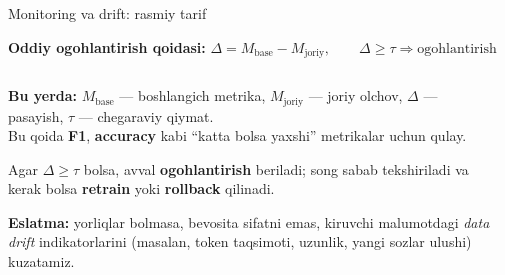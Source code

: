 \documentclass[aspectratio=169,11pt]{beamer}
\newcommand{\uzq}{\textquotesingle{}}   %
\begin{document}
\begin{frame}{Monitoring va drift: rasmiy ta\uzq{}rif}
  \small

  \begin{tcolorbox}[defbox]
    \centering
    \textbf{Oddiy ogohlantirish qoidasi:}\qquad
    $\Delta = M_{\text{base}} - M_{\text{joriy}}, \qquad
    \Delta \ge \tau \Rightarrow \text{ogohlantirish}$
  \end{tcolorbox}

  \vspace{2pt}

  \begin{columns}[T,totalwidth=\textwidth]
    \begin{column}{0.44\textwidth}
      \footnotesize
      \textbf{Bu yerda:}
      $M_{\text{base}}$ --- boshlang\uzq{}ich metrika,
      $M_{\text{joriy}}$ --- joriy o\uzq{}lchov,
      $\Delta$ --- pasayish,
      $\tau$ --- chegaraviy qiymat.\\[4pt]

      Bu qoida \textbf{F1}, \textbf{accuracy} kabi
      ``katta bo\uzq{}lsa yaxshi'' metrikalar uchun qulay.\\[5pt]

      \begin{tcolorbox}[okbox,top=2pt,bottom=2pt,left=3pt,right=3pt]
        \scriptsize
        Agar $\Delta \ge \tau$ bo\uzq{}lsa, avval \textbf{ogohlantirish} beriladi;
        so\uzq{}ng sabab tekshiriladi va kerak bo\uzq{}lsa
        \textbf{retrain} yoki \textbf{rollback} qilinadi.
      \end{tcolorbox}

      \vspace{3pt}
      {\scriptsize
      \textbf{Eslatma:} yorliqlar bo\uzq{}lmasa, bevosita sifatni emas,
      kiruvchi ma\uzq{}lumotdagi \textit{data drift} indikatorlarini
      (masalan, token taqsimoti, uzunlik, yangi so\uzq{}zlar ulushi) kuzatamiz.
      }
    \end{column}

    \begin{column}{0.53\textwidth}
      \centering
\end{column}
\end{columns}
\end{frame}
\end{document}
